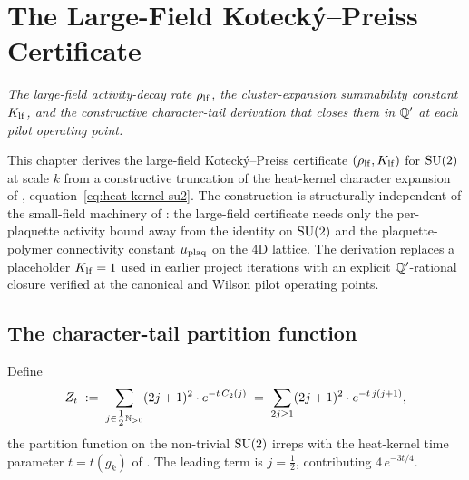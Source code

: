 %

\chapter{The Large-Field Kotecký--Preiss Certificate}
\label{ch:large-field-kp}

\noindent\emph{The large-field activity-decay rate $\rho_{\mathrm{lf}}$, the
cluster-expansion summability constant $K_{\mathrm{lf}}$, and the constructive
character-tail derivation that closes them in $\mathbb{Q}'$ at each pilot
operating point.}

This chapter derives the large-field Kotecký--Preiss certificate
$(\rho_{\mathrm{lf}}, K_{\mathrm{lf}})$ for $\mathrm{SU}(2)$ at scale $k$ from a constructive
truncation of the heat-kernel character expansion of
, equation~\eqref{eq:heat-kernel-su2}.  The
construction is structurally independent of the small-field
machinery of : the large-field certificate
needs only the per-plaquette activity bound away from the identity
on $\mathrm{SU}(2)$ and the plaquette-polymer connectivity constant
$\mu_{\mathrm{plaq}}$ on the 4D lattice.  The derivation replaces a placeholder
$K_{\mathrm{lf}} = 1$ used in earlier project iterations with an explicit
$\mathbb{Q}'$-rational closure verified at the canonical and Wilson pilot
operating points.

\section{The character-tail partition function}
\label{sec:Zt}

%

Define
\begin{equation}
  \label{eq:zt-definition}
  Z_t \;:=\; \sum_{j \in \tfrac12\mathbb{N}_{> 0}} (2j+1)^2 \cdot e^{-t\,C_2(j)}
  \;=\;
  \sum_{2j \ge 1} (2j+1)^2 \cdot e^{-t\,j(j+1)} ,
\end{equation}
the partition function on the non-trivial $\mathrm{SU}(2)$ irreps with the
heat-kernel time parameter $t = t(g_k)$ of .
The leading term is $j = \tfrac12$, contributing $4\,e^{-3t/4}$.

